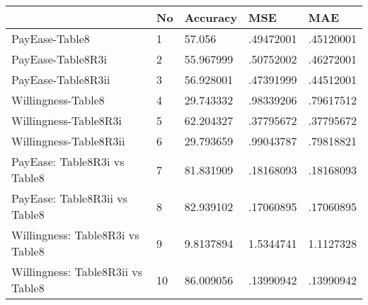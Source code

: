 \begin{table}[htbp]
\begin{tabular}{|l|l|l|l|l|}\hline  
 & No  & Accuracy  & MSE  & MAE  \\ \hline  
PayEase-Table8 & 1 & 57.056 & .49472001 & .45120001 \\ \hline 
PayEase-Table8R3i & 2 & 55.967999 & .50752002 & .46272001 \\ \hline 
PayEase-Table8R3ii & 3 & 56.928001 & .47391999 & .44512001 \\ \hline 
Willingness-Table8 & 4 & 29.743332 & .98339206 & .79617512 \\ \hline 
Willingness-Table8R3i & 5 & 62.204327 & .37795672 & .37795672 \\ \hline 
Willingness-Table8R3ii & 6 & 29.793659 & .99043787 & .79818821 \\ \hline 
PayEase: Table8R3i vs Table8 & 7 & 81.831909 & .18168093 & .18168093 \\ \hline 
PayEase: Table8R3ii vs Table8 & 8 & 82.939102 & .17060895 & .17060895 \\ \hline 
Willingness: Table8R3i vs Table8 & 9 & 9.8137894 & 1.5344741 & 1.1127328 \\ \hline 
Willingness: Table8R3ii vs Table8 & 10 & 86.009056 & .13990942 & .13990942 \\ \hline 
  \end{tabular}
\end{table}
